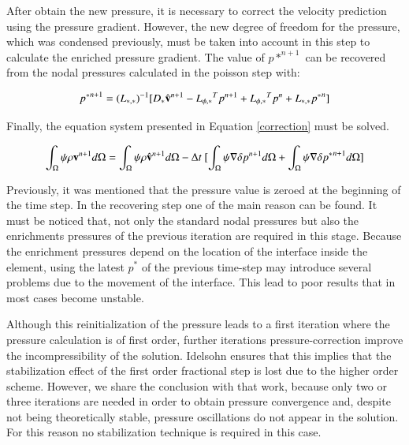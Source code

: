 After obtain the new pressure, it is necessary to correct the velocity prediction using the pressure gradient. However, the new degree of freedom for the pressure, which was condensed previously, must be taken into account in this step to calculate the enriched pressure gradient. The value of $p*^{n+1}$ can be recovered from the nodal pressures calculated in the poisson step with:

\begin{equation}
  {p^*}^{n+1} = {(L_{*,*})}^{-1}[D_* \hat{\mathbf{v}}^{n+1} - {L_{\phi,*}}^Tp^{n+1} + {L_{\phi,*}}^Tp^{n} + L_{*,*}{p^*}^n]
  \label{recovering}
\end{equation}

 Finally, the equation system presented in Equation \ref{correction} must be solved.

 \begin{equation}
  \int_{\Omega} \psi \rho \vv^{n+1} d\Omega = \int_{\Omega} \psi \rho \hat{\vv}^{n+1} d\Omega - \Delta t \ [\int_{\Omega} \psi \nabla \delta p^{n+1} d\Omega + \int_{\Omega} \psi \nabla \delta {p^*}^{n+1} d\Omega]
  \label{correction}
 \end{equation}

Previously, it was mentioned that the pressure value is zeroed at the beginning of the time step. In the recovering step one of the main reason can be found. It must be noticed that, not only the standard nodal pressures but also the enrichments pressures of the previous iteration are required in this stage. Because the enrichment pressures depend on the location of the interface inside the element, using the latest $p^*$ of the previous time-step may introduce several problems due to the movement of the interface. This lead to poor results that in most cases become unstable.

Although this reinitialization of the pressure leads to a first iteration where the pressure calculation is of first order, further iterations pressure-correction improve the incompressibility of the solution. Idelsohn\cite{Idelsohn13c} ensures that this implies that the stabilization effect of the first order fractional step is lost due to the higher order scheme. However, we share the conclusion with that work, because only two or three iterations are needed in order to obtain pressure convergence and, despite not being theoretically stable, pressure oscillations do not appear in the solution. For this reason no stabilization technique is required in this case.